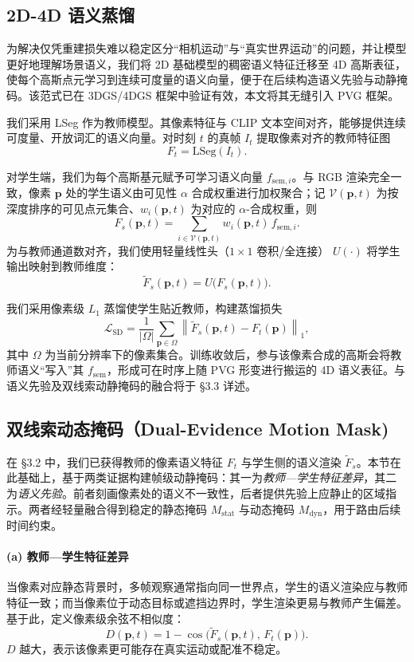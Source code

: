 \documentclass[10pt,conference]{IEEEtran} %
\begin{document}
\subsection{2D-4D 语义蒸馏}

为解决仅凭重建损失难以稳定区分“相机运动”与“真实世界运动”的问题，并让模型更好地理解场景语义，我们将 2D 基础模型的稠密语义特征迁移至 4D 高斯表征，使每个高斯点元学习到连续可度量的语义向量，便于在后续构造语义先验与动静掩码。该范式已在 3DGS/4DGS 框架中验证有效，本文将其无缝引入 PVG 框架。

我们采用 LSeg 作为教师模型。其像素特征与 CLIP 文本空间对齐，能够提供连续可度量、开放词汇的语义向量。对时刻 $t$ 的真帧 $I_t$ 提取像素对齐的教师特征图
\[
F_t=\mathrm{LSeg}(I_t).
\]

对学生端，我们为每个高斯基元赋予可学习语义向量 $f_{\text{sem},i}$。与 RGB 渲染完全一致，像素 $\mathbf p$ 处的学生语义由可见性 $\alpha$ 合成权重进行加权聚合；记 $\mathcal V(\mathbf p,t)$ 为按深度排序的可见点元集合、$w_i(\mathbf p,t)$ 为对应的 $\alpha$-合成权重，则
\begin{equation}
F_s(\mathbf p,t)=\sum_{i\in\mathcal V(\mathbf p,t)} w_i(\mathbf p,t)\,f_{\text{sem},i}.
\label{eq:feature_render}
\end{equation}
为与教师通道数对齐，我们使用轻量线性头（$1{\times}1$ 卷积/全连接） $U(\cdot)$ 将学生输出映射到教师维度：
\[
\tilde F_s(\mathbf p,t)=U\!\big(F_s(\mathbf p,t)\big).
\]

我们采用像素级 $L_1$ 蒸馏使学生贴近教师，构建蒸馏损失
\[
\mathcal{L}_{\mathrm{SD}}
=\frac{1}{|\Omega|}\sum_{\mathbf p\in\Omega}\left\|\tilde F_s(\mathbf p,t)-F_t(\mathbf p)\right\|_1,
\]
其中 $\Omega$ 为当前分辨率下的像素集合。训练收敛后，参与该像素合成的高斯会将教师语义“写入”其 $f_{\mathrm{sem}}$，形成可在时序上随 PVG 形变进行搬运的 4D 语义表征。与语义先验及双线索动静掩码的融合将于 §3.3 详述。

\subsection{双线索动态掩码（Dual-Evidence Motion Mask)}
在 §3.2 中，我们已获得教师的像素语义特征 $F_t$ 与学生侧的语义渲染 $\tilde F_s$。本节在此基础上，基于两类证据构建帧级动静掩码：其一为\emph{教师—学生特征差异}，其二为\emph{语义先验}。前者刻画像素处的语义不一致性，后者提供先验上应静止的区域指示。两者经轻量融合得到稳定的静态掩码 $M_{\mathrm{stat}}$ 与动态掩码 $M_{\mathrm{dyn}}$，用于路由后续时间约束。

\paragraph{(a) 教师—学生特征差异}
当像素对应静态背景时，多帧观察通常指向同一世界点，学生的语义渲染应与教师特征一致；而当像素位于动态目标或遮挡边界时，学生渲染更易与教师产生偏差。基于此，定义像素级余弦不相似度：
\begin{equation}
D(\mathbf p,t)=1-\cos\!\big(\tilde F_s(\mathbf p,t),\,F_t(\mathbf p)\big).
\label{eq:demm_diff_simple}
\end{equation}
$D$ 越大，表示该像素更可能存在真实运动或配准不稳定。
\end{document}
